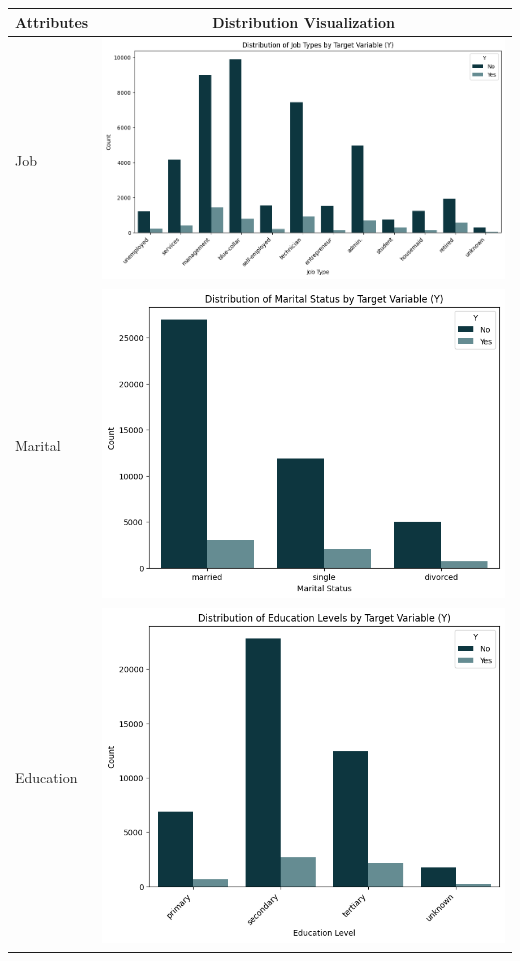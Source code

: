 \documentclass{article}
\begin{document}
           \begin{longtable}{|l|c|}
               \hline
               \textbf{Attributes} & \textbf{Distribution Visualization} \\
               \hline
               \endhead
               Job & \includegraphics[width=0.7\linewidth]{data/bank_marketing/pic/Bank_job.png} \\ \hline
               Marital & \includegraphics[width=0.7\linewidth]{data/bank_marketing/pic/Bank_marital.png} \\ \hline
               Education & \includegraphics[width=0.7\linewidth]{data/bank_marketing/pic/Bank_edu.png} \\ \hline

\end{longtable}
\end{document}
